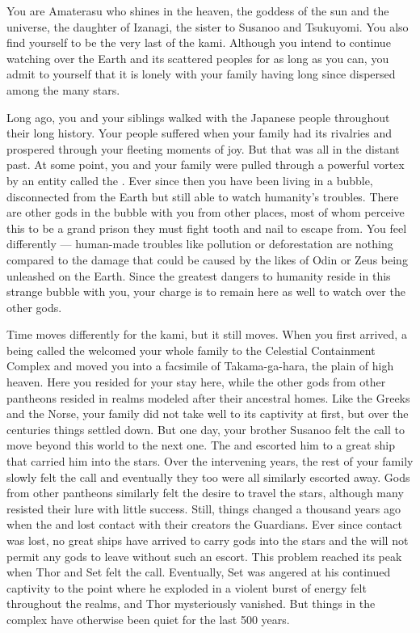 \documentclass[char]{guardians}
\begin{document}
\name{\cAmaterasu{}}

You are Amaterasu who shines in the heaven, the goddess of the sun and the universe, the daughter of Izanagi, the sister to Susanoo and Tsukuyomi. You also find yourself to be the very last of the kami. Although you intend to continue watching over the Earth and its scattered peoples for as long as you can, you admit to yourself that it is lonely with your family having long since dispersed among the many stars.

Long ago, you and your siblings walked with the Japanese people throughout their long history. Your people suffered when your family had its rivalries and prospered through your fleeting moments of joy. But that was all in the distant past. At some point, you and your family were pulled through a powerful vortex by an entity called the \cWarden{}. Ever since then you have been living in a bubble, disconnected from the Earth but still able to watch humanity's troubles. There are other gods in the bubble with you from other places, most of whom perceive this to be a grand prison they must fight tooth and nail to escape from. You feel differently --- human-made troubles like pollution or deforestation are nothing compared to the damage that could be caused by the likes of Odin or Zeus being unleashed on the Earth. Since the greatest dangers to humanity reside in this strange bubble with you, your charge is to remain here as well to watch over the other gods.

Time moves differently for the kami, but it still moves. When you first arrived, a being called the \cCaretaker{} welcomed your whole family to the Celestial Containment Complex and moved you into a facsimile of Takama-ga-hara, the plain of high heaven. Here you resided for your stay here, while the other gods from other pantheons resided in realms modeled after their ancestral homes. Like the Greeks and the Norse, your family did not take well to its captivity at first, but over the centuries things settled down. But one day, your brother Susanoo felt the call to move beyond this world to the next one. The \cCaretaker{} and \cWarden{} escorted him to a great ship that carried him into the stars. Over the intervening years, the rest of your family slowly felt the call and eventually they too were all similarly escorted away. Gods from other pantheons similarly felt the desire to travel the stars, although many resisted their lure with little success. Still, things changed a thousand years ago when the \cCaretaker{} and \cWarden{} lost contact with their creators the Guardians. Ever since contact was lost, no great ships have arrived to carry gods into the stars and the \cWarden{} will not permit any gods to leave without such an escort. This problem reached its peak when Thor and Set felt the call. Eventually, Set was angered at his continued captivity to the point where he exploded in a violent burst of energy felt throughout the realms, and Thor mysteriously vanished. But things in the complex have otherwise been quiet for the last 500 years.
\end{document}

